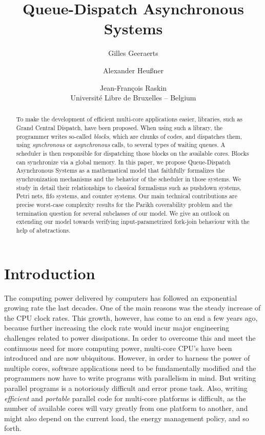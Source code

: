 \documentclass[runningheads,oribibl,]{article}
\begin{document}
\title{Queue-Dispatch Asynchronous Systems}
\author{Gilles Geeraerts
\and Alexander Heußner
\and Jean-François Raskin\\[1.5ex]Université Libre de Bruxelles -- Belgium}
\maketitle

\begin{abstract}
  To make the development of efficient multi-core applications easier,
  libraries, such as Grand Central Dispatch, have been proposed. When
  using such a library, the programmer writes so-called {\em blocks},
  which are chunks of codes, and dispatches them, using {\em
    synchronous} or {\em asynchronous} calls, to several types of
  waiting queues. A scheduler is then responsible for dispatching
  those blocks on the available cores.  Blocks can synchronize via a
  global memory.  In this paper, we propose Queue-Dispatch
  Asynchronous Systems as a mathematical model that faithfully
  formalizes the synchronization mechanisms and the behavior of the
  scheduler in those systems.  We study in detail their relationships
  to classical formalisms such as pushdown systems, Petri nets, fifo
  systems, and counter systems.  Our main technical contributions are
  precise worst-case complexity results for the Parikh coverability
  problem and the termination question for several subclasses of our
  model. We give an outlook on
  extending our model towards verifying input-parametrized fork-join
  behaviour with the help of abstractions.
\end{abstract}

\section{Introduction\label{sec:introduction}}
The computing power delivered by computers has followed an exponential growing
rate the last decades. One of the main reasons was the steady increase of the CPU
clock rates. This growth, however, has come to an end a few years ago, because
further increasing the clock rate would incur major engineering challenges
related to power dissipations.  In order to overcome this and meet the continuous
need for more computing power, multi-core CPU's have been introduced and are now
ubiquitous. However, in order to harness the power of multiple cores, software
applications need to be fundamentally modified and the programmers now have to
write programs with parallelism in mind. But writing parallel programs is a
notoriously difficult and error prone task. Also, writing {\em efficient} and
{\em portable} parallel code for multi-core platforms is difficult, as the number
of available cores will vary greatly from one platform to another, and might also
depend on the current load, the energy management policy, and so forth.
\end{document}
